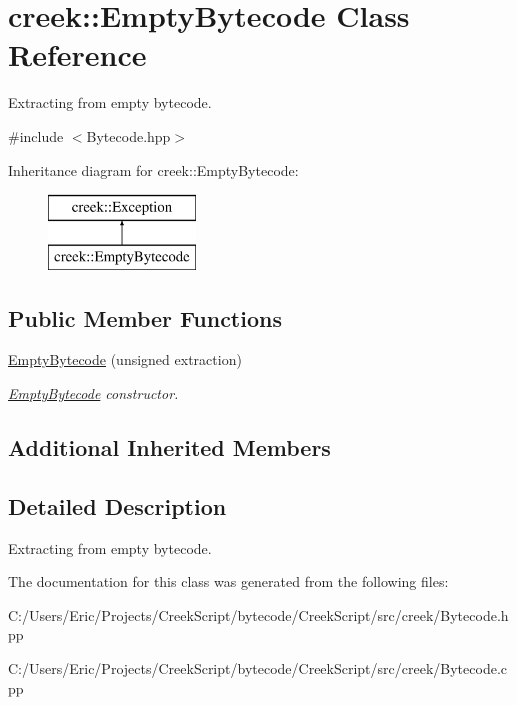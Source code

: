 \hypertarget{classcreek_1_1_empty_bytecode}{}\section{creek\+:\+:Empty\+Bytecode Class Reference}
\label{classcreek_1_1_empty_bytecode}


Extracting from empty bytecode.  




{\ttfamily \#include $<$Bytecode.\+hpp$>$}

Inheritance diagram for creek\+:\+:Empty\+Bytecode\+:\begin{figure}[H]
\begin{center}
\leavevmode
\includegraphics[height=2.000000cm]{classcreek_1_1_empty_bytecode}
\end{center}
\end{figure}
\subsection*{Public Member Functions}
\begin{DoxyCompactItemize}
\item 
\hyperlink{classcreek_1_1_empty_bytecode_a7aa4262aa015e565fb01493ef56f7438}{Empty\+Bytecode} (unsigned extraction)\hypertarget{classcreek_1_1_empty_bytecode_a7aa4262aa015e565fb01493ef56f7438}{}\label{classcreek_1_1_empty_bytecode_a7aa4262aa015e565fb01493ef56f7438}

\begin{DoxyCompactList}\small\item\em {\ttfamily \hyperlink{classcreek_1_1_empty_bytecode}{Empty\+Bytecode}} constructor. \end{DoxyCompactList}\end{DoxyCompactItemize}
\subsection*{Additional Inherited Members}


\subsection{Detailed Description}
Extracting from empty bytecode. 

The documentation for this class was generated from the following files\+:\begin{DoxyCompactItemize}
\item 
C\+:/\+Users/\+Eric/\+Projects/\+Creek\+Script/bytecode/\+Creek\+Script/src/creek/Bytecode.\+hpp\item 
C\+:/\+Users/\+Eric/\+Projects/\+Creek\+Script/bytecode/\+Creek\+Script/src/creek/Bytecode.\+cpp\end{DoxyCompactItemize}
